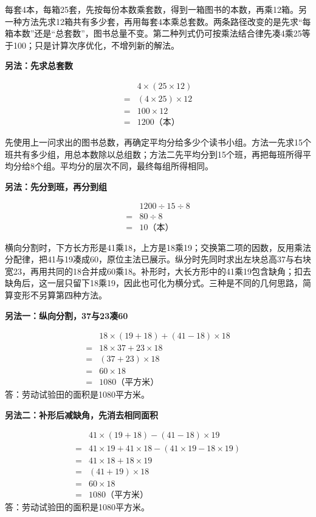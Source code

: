 \documentclass[multi=snippet,border=0pt]{standalone}
\newenvironment{snippet}[3]{\begin{minipage}{#1bp}\color{answerred}\fontsize{#2}{#3}\selectfont\raggedright}{\end{minipage}}
\begin{document}
\begin{snippet}{505}{11.5}{14}每套4本，每箱25套，先按每份本数乘套数，得到一箱图书的本数，再乘12箱。另一种方法先求12箱共有多少套，再用每套4本乘总套数。两条路径改变的是先求“每箱本数”还是“总套数”，图书总量不变。第二种列式仍可按乘法结合律先凑4乘25等于100；只是计算次序优化，不增列新的解法。\par \textbf{另法：先求总套数}\par \[\begin{aligned}&4\times(25\times12)\\={}&(4\times25)\times12\\={}&100\times12\\={}&1200\text{（本）}\end{aligned}\]\end{snippet}
\begin{snippet}{505}{11.5}{14}先使用上一问求出的图书总数，再确定平均分给多少个读书小组。方法一先求15个班共有多少组，用总本数除以总组数；方法二先平均分到15个班，再把每班所得平均分给8个组。平均分的层次不同，最终每组所得相同。\par \textbf{另法：先分到班，再分到组}\par \[\begin{aligned} &1200\div15\div8\\={}&80\div8\\={}&10\text{（本）}\end{aligned}\]\end{snippet}
\begin{snippet}{505}{11.5}{14}横向分割时，下方长方形是41乘18，上方是18乘19；交换第二项的因数，反用乘法分配律，把41与19凑成60，原位主法已展示。纵分时先同时求出左块总高37与右块宽23，再用共同的18合并成60乘18。补形时，大长方形中的41乘19包含缺角；扣去缺角后，这一层只留下18乘19，因此也可化为横分式。三种是不同的几何思路，简算变形不另算第四种方法。\par \textbf{另法一：纵向分割，37与23凑60}\par \[\begin{aligned}&18\times(19+18)+(41-18)\times18\\={}&18\times37+23\times18\\={}&(37+23)\times18\\={}&60\times18\\={}&1080\text{（平方米）}\end{aligned}\]答：劳动试验田的面积是1080平方米。\par \textbf{另法二：补形后减缺角，先消去相同面积}\par \[\begin{aligned}&41\times(19+18)-(41-18)\times19\\={}&41\times19+41\times18-(41\times19-18\times19)\\={}&41\times18+18\times19\\={}&(41+19)\times18\\={}&60\times18\\={}&1080\text{（平方米）}\end{aligned}\]答：劳动试验田的面积是1080平方米。\end{snippet}
\end{document}
